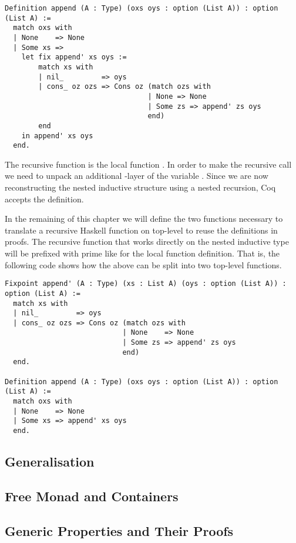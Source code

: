 \begin{verbatim}
Definition append (A : Type) (oxs oys : option (List A)) : option (List A) :=
  match oxs with
  | None    => None
  | Some xs =>
    let fix append' xs oys :=
        match xs with
        | nil_         => oys
        | cons_ oz ozs => Cons oz (match ozs with
                                  | None => None
                                  | Some zs => append' zs oys
                                  end)
        end
    in append' xs oys
  end.
\end{verbatim}

The recursive function is the local function
.
In order to make the recursive call we need to unpack an additional
-layer of the variable .
Since we are now reconstructing the nested inductive structure using a
nested recursion, Coq accepts the definition.

In the remaining of this chapter we will define the two functions
necessary to translate a recursive Haskell function on top-level to
reuse the definitions in proofs.
The recursive function that works directly on the nested inductive
type will be prefixed with prime like for the local function definition.
That is, the following code shows how the above can be split into two
top-level functions.

\begin{verbatim}
Fixpoint append' (A : Type) (xs : List A) (oys : option (List A)) : option (List A) :=
  match xs with
  | nil_         => oys
  | cons_ oz ozs => Cons oz (match ozs with
                            | None    => None
                            | Some zs => append' zs oys
                            end)
  end.

Definition append (A : Type) (oxs oys : option (List A)) : option (List A) :=
  match oxs with
  | None    => None
  | Some xs => append' xs oys
  end.
\end{verbatim}

\subsection{Generalisation}

\subsection{Free Monad and Containers}
\subsection{Generic Properties and Their Proofs}


